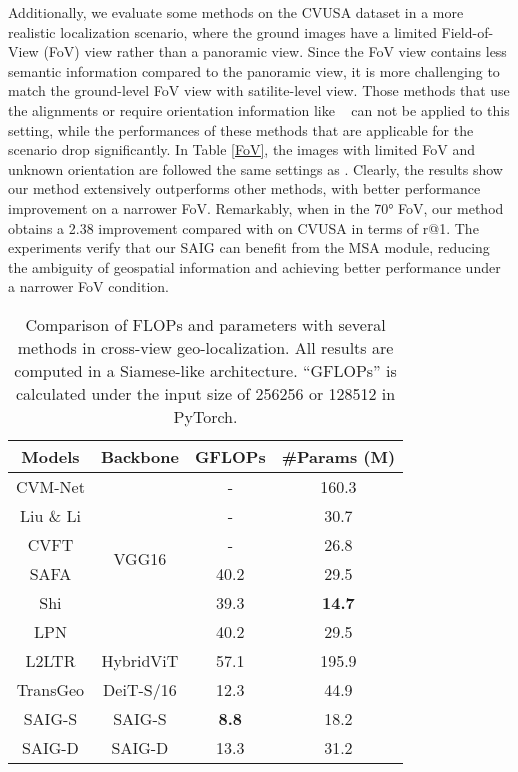 \documentclass[sn-basic,iicol]{sn-jnl}
\theoremstyle{thmstyletwo}\newtheorem{example}{Example}\newtheorem{remark}{Remark}
\theoremstyle{thmstylethree}\newtheorem{definition}{Definition}
\begin{document}
 Additionally, we evaluate some methods on the CVUSA dataset in a more realistic localization scenario, where the ground images have a limited Field-of-View (FoV) view rather than a panoramic view. Since the FoV view contains less semantic information compared to the panoramic view, it is more challenging to match the ground-level FoV view with satilite-level view.
Those methods that use the alignments or require orientation information like ~\citep{liu2019lending} can not be applied to this setting, while the performances of these methods that are applicable for the scenario drop significantly.
In Table \ref{FoV}, the images with limited FoV and unknown orientation are followed the same settings as \citep{DSM2020}. Clearly, the results show our method extensively outperforms other methods, with better performance improvement on a narrower FoV. Remarkably, when in the 70° FoV, our method obtains a 2.38 improvement compared with \citep{DSM2020} on CVUSA in terms of r@1. The experiments verify that our SAIG can benefit from the MSA module, reducing the ambiguity of geospatial information and achieving better performance under a narrower FoV condition.






\begin{table}[ht]
\setlength{\abovecaptionskip}{0.2cm}
\centering
\begin{tabular}{cc|c|c}
\toprule
Models & Backbone & GFLOPs & \#Params (M) \\\midrule
CVM-Net &\multirow{6}{*}{VGG16}& - & 160.3\\
Liu \& Li & ~ & - & 30.7\\
CVFT & ~ & - & 26.8\\
SAFA& ~ & 40.2 & 29.5 \\ 
Shi& ~ & 39.3 & \textbf{14.7} \\
LPN & ~ & 40.2 & 29.5 \\ \midrule
L2LTR& HybridViT & 57.1 & 195.9 \\
TransGeo& DeiT-S/16 & 12.3 & 44.9 \\
\midrule
SAIG-S & SAIG-S & \textbf{8.8} & 18.2 \\
SAIG-D & SAIG-D & 13.3 & 31.2 \\\bottomrule
\end{tabular}
\caption{Comparison of FLOPs and parameters with several methods in cross-view geo-localization. All results are computed in a Siamese-like architecture. “GFLOPs” is calculated under the input size of 256256 or 128512 in PyTorch.}
\label{model complexity}
\vspace{-3pt}
\end{table}
\end{document}
